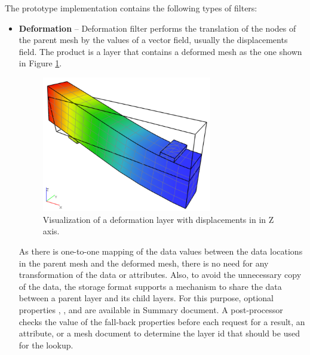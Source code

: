 The prototype implementation contains the following types of filters:


\begin{itemize}

    \item \textbf{Deformation} -- Deformation filter performs the translation of the nodes of the parent mesh by the values of a vector field, usually the displacements field. The product is a layer that contains a deformed mesh as the one shown in Figure \ref{fig:beam-deformation-layer}.

    \begin{figure}[H]
        \centering
        \includegraphics[width=0.7\textwidth]{figures/chapter-data-management/beam-deformation-layer}
        \decoRule
        \caption[Visualization of a deformation layer.]{Visualization of a deformation layer with displacements in in Z axis.}
        \label{fig:beam-deformation-layer}
    \end{figure}
    
    As there is one-to-one mapping of the data values between the data locations in the parent mesh and the deformed mesh, there is no need for any transformation of the data or attributes. Also, to avoid the unnecessary copy of the data, the storage format supports a mechanism to share the data between a parent layer and its child layers. For this purpose, optional properties , , and  are available in Summary document. A post-processor checks the value of the fall-back properties before each request for a result, an attribute, or a mesh document to determine the layer id that should be used for the lookup.
    

\end{itemize}
